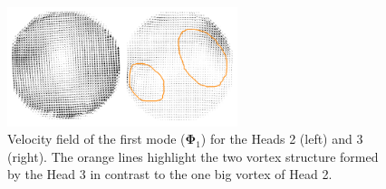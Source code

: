 \documentclass[10pt,fleqn,a4paper]{article}
\newcommand{\bv}[1]{\mathbf{#1}}
\begin{document}
\begin{figure}[h]
 \centering
 \includegraphics[width=0.6\textwidth]{./imgs/scania-vs-sygma.png}
 \caption{Velocity field of the first mode ($\bv{\Phi}_1$) for the Heads 2 (left) and 3 (right). The orange lines highlight the two vortex structure formed by the Head 3 in contrast to the one big vortex of Head 2.}
 \label{fig: scaniavssygma}
\end{figure}
\end{document}
